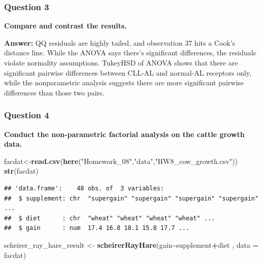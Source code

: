 \documentclass[
]{article}
\newenvironment{Shaded}{\begin{snugshade}}{\end{snugshade}}
\newcommand{\AttributeTok}[1]{\textcolor[rgb]{0.13,0.29,0.53}{#1}}
\newcommand{\FunctionTok}[1]{\textcolor[rgb]{0.13,0.29,0.53}{\textbf{#1}}}
\newcommand{\NormalTok}[1]{#1}
\newcommand{\OtherTok}[1]{\textcolor[rgb]{0.56,0.35,0.01}{#1}}
\newcommand{\SpecialCharTok}[1]{\textcolor[rgb]{0.81,0.36,0.00}{\textbf{#1}}}
\newcommand{\StringTok}[1]{\textcolor[rgb]{0.31,0.60,0.02}{#1}}
\begin{document}
\subsubsection{Question 3}\label{question-3}

\textbf{Compare and contrast the results.}

\textbf{Answer:} QQ residuals are highly tailed, and observation 37 hits
a Cook's distance line. While the ANOVA says there's significant
differences, the residuals violate normality assumptions. TukeyHSD of
ANOVA shows that there are significant pairwise differences between
CLL-AL and normal-AL receptors only, while the nonparametric analysis
suggests there are more significant pairwise differences than those two
pairs.

\subsubsection{Question 4}\label{question-4}

\textbf{Conduct the non-parametric factorial analysis on the cattle
growth data.}

\begin{Shaded}
\begin{Highlighting}[]
\NormalTok{facdat}\OtherTok{\textless{}{-}}\FunctionTok{read.csv}\NormalTok{(}\FunctionTok{here}\NormalTok{(}\StringTok{"Homework\_08"}\NormalTok{,}\StringTok{"data"}\NormalTok{,}\StringTok{"HW8\_cow\_growth.csv"}\NormalTok{))}
\FunctionTok{str}\NormalTok{(facdat)}
\end{Highlighting}
\end{Shaded}

\begin{verbatim}
## 'data.frame':    48 obs. of  3 variables:
##  $ supplement: chr  "supergain" "supergain" "supergain" "supergain" ...
##  $ diet      : chr  "wheat" "wheat" "wheat" "wheat" ...
##  $ gain      : num  17.4 16.8 18.1 15.8 17.7 ...
\end{verbatim}

\begin{Shaded}
\begin{Highlighting}[]
\NormalTok{scheirer\_ray\_hare\_result }\OtherTok{\textless{}{-}} \FunctionTok{scheirerRayHare}\NormalTok{(gain}\SpecialCharTok{\textasciitilde{}}\NormalTok{supplement}\SpecialCharTok{+}\NormalTok{diet , }\AttributeTok{data =}\NormalTok{ facdat)}
\end{Highlighting}
\end{Shaded}
\end{document}
